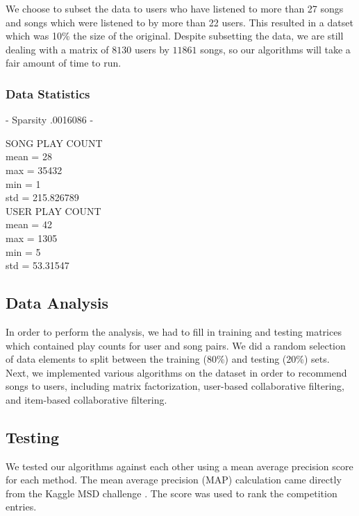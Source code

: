 \documentclass[12pt,preprint]{aastex}
\begin{document}
We choose to subset the data to users who have listened to more than 27 songs and songs which were listened to by more than 22 users. This resulted in a datset which was 10\% the size of the original. Despite subsetting the data, we are still dealing with a matrix of $8130$ users by $11861$ songs, so our algorithms will take a fair amount of time to run.

\subsubsection{Data Statistics}

- Sparsity .0016086
- 

SONG PLAY COUNT  \\
mean = 28 \\
max = 35432 \\
min = 1 \\
std = 215.826789\\

USER PLAY COUNT\\
mean = 42\\
max = 1305\\
min = 5\\
std = 53.31547\\


\subsection{Data Analysis}
In order to perform the analysis, we had to fill in training and testing matrices which contained play counts for user and song pairs. We did a random selection of data elements to split between the training (80\%) and testing (20\%) sets. Next, we implemented various algorithms on the dataset in order to recommend songs to users, including matrix factorization, user-based collaborative filtering, and item-based collaborative filtering.

\subsection{Testing}
We tested our algorithms against each other using a mean average precision 
score for each method.  The mean average precision (MAP) calculation came directly from the Kaggle MSD challenge \citep{kaggleMSD}. The score was used to rank the competition entries.
\end{document}
